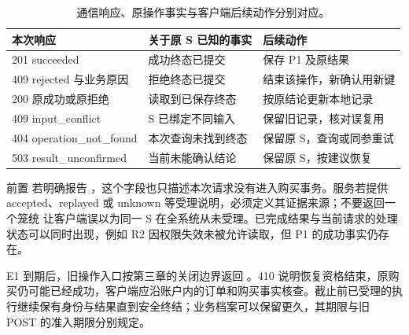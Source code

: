 \begin{table}[htbp]
\centering\small
\begin{tabularx}{\linewidth}{@{}p{4.2cm}XX@{}}
\toprule
本次响应 & 关于原 S 已知的事实 & 后续动作\\
\midrule
201 succeeded & 成功终态已提交 & 保存 P1 及原结果\\
409 rejected 与业务原因 & 拒绝终态已提交 & 结束该操作，新确认用新键\\
200 原成功或原拒绝 & 读取到已保存终态 & 按原结论更新本地记录\\
409 input\_conflict & S 已绑定不同输入 & 保留旧记录，核对误复用\\
404 operation\_not\_found & 本次查询未找到终态 & 保留原 S，查询或同参重试\\
503 result\_unconfirmed & 当前未能确认结论 & 保留原 S，按建议恢复\\
\bottomrule
\end{tabularx}
\caption{通信响应、原操作事实与客户端后续动作分别对应。}
\end{table}

前置  若明确报告 ，这个字段也只描述本次请求没有进入购买事务。服务若提供 accepted、replayed 或 unknown 等受理说明，必须定义其证据来源；不要返回一个笼统  让客户端误以为同一 S 在全系统从未受理。已完成结果与当前请求的处理状态可以同时出现，例如 R2 因权限失效未被允许读取，但 P1 的成功事实仍存在。

E1 到期后，旧操作入口按第三章的关闭边界返回 。410 说明恢复资格结束，原购买仍可能已经成功，客户端应沿账户内的订单和购买事实核查。截止前已受理的执行继续保有身份与结果直到安全终结；业务档案可以保留更久，其期限与旧 POST 的准入期限分别规定。
\FloatBarrier
